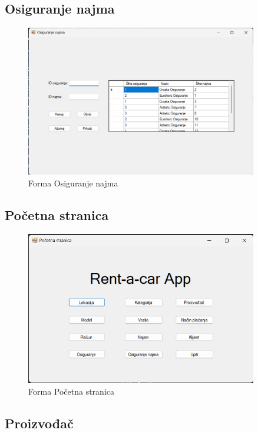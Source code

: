\documentclass[]{foi}
\begin{document}
\subsection{Osiguranje najma}

\begin{figure}[!ht]
    \centering
    \includegraphics[width=0.9\textwidth]{slike/osiguranjenajma.png}
    \caption{Forma Osiguranje najma}
    \label{fig:osiguranjenajma}
\end{figure}
\newpage

\subsection{Početna stranica}

\begin{figure}[!ht]
    \centering
    \includegraphics[width=0.9\textwidth]{slike/pocetna.png}
    \caption{Forma Početna stranica}
    \label{fig:pocetna}
\end{figure}

\subsection{Proizvođač}
\end{document}
